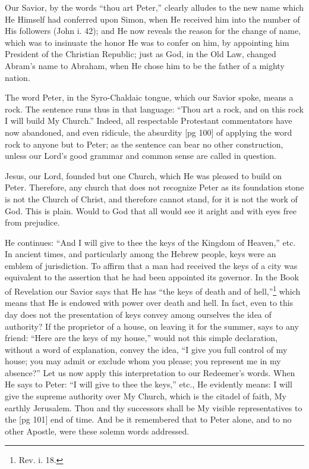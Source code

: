 Our Savior, by the words “thou art Peter,”
clearly alludes to the new name which He Himself
had conferred upon Simon, when He received him
into the number of His followers (John i. 42);
and He now reveals the reason for the change of
name, which was to insinuate the honor He was to
confer on him, by appointing him President of
the Christian Republic; just as God, in the Old
Law, changed Abram's name to Abraham, when
He chose him to be the father of a mighty nation.

The word Peter, in the Syro-Chaldaic tongue,
which our Savior spoke, means a rock. The sentence
runs thus in that language: “Thou art a rock,
and on this rock I will build My Church.”
Indeed, all respectable Protestant commentators
have now abandoned, and even ridicule, the absurdity
[pg 100]
of applying the word rock to anyone but
to Peter; as the sentence can bear no other construction,
unless our Lord's good grammar and
common sense are called in question.

Jesus, our Lord, founded but one Church, which
He was pleased to build on Peter. Therefore, any
church that does not recognize Peter as its foundation
stone is not the Church of Christ, and therefore
cannot stand, for it is not the work of God.
This is plain. Would to God that all would see it
aright and with eyes free from prejudice.

He continues: “And I will give to thee the
keys of the Kingdom of Heaven,” etc. In ancient
times, and particularly among the Hebrew people,
keys were an emblem of jurisdiction. To affirm
that a man had received the keys of a city was
equivalent to the assertion that he had been appointed
its governor. In the Book of Revelation
our Savior says that He has “the keys of death
and of hell,”\footnote{Rev. i.
18.} which means that He is endowed
with power over death and hell. In fact, even to
this day does not the presentation of keys convey
among ourselves the idea of authority? If the
proprietor of a house, on leaving it for the summer,
says to any friend: “Here are the keys of
my house,” would not this simple declaration,
without a word of explanation, convey the idea,
“I give you full control of my house; you may
admit or exclude whom you please; you represent
me in my absence?” Let us now apply this interpretation
to our Redeemer's words. When He
says to Peter: “I will give to thee the keys,” etc.,
He evidently means: I will give the supreme authority
over My Church, which is the citadel of
faith, My earthly Jerusalem. Thou and thy successors
shall be My visible representatives to the
[pg 101]
end of time. And be it remembered that to Peter
alone, and to no other Apostle, were these solemn
words addressed.

